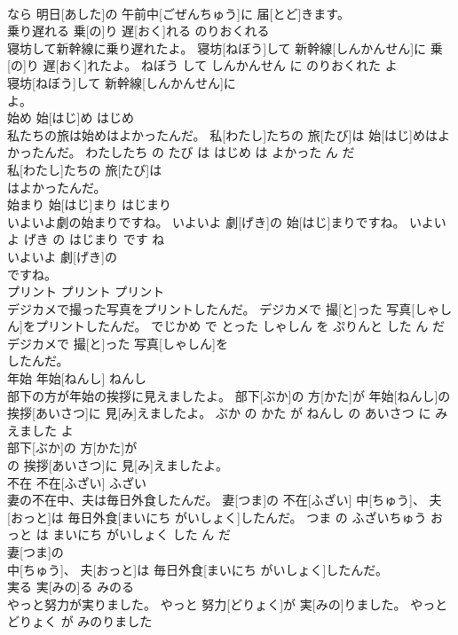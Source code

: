 \documentclass[8pt]{extreport}
\begin{document}
\begin{CJK}{UTF8}{min}
\\	なら 明日[あした]の 午前中[ごぜんちゅう]に 届[とど]きます。			
\\	乗り遅れる	乗[の]り 遅[おく]れる	のりおくれる	
\\	寝坊して新幹線に乗り遅れたよ。	寝坊[ねぼう]して 新幹線[しんかんせん]に 乗[の]り 遅[おく]れたよ。	ねぼう して しんかんせん に のりおくれた よ	
\\	寝坊[ねぼう]して 新幹線[しんかんせん]に
\\	よ。			
\\	始め	始[はじ]め	はじめ	
\\	私たちの旅は始めはよかったんだ。	私[わたし]たちの 旅[たび]は 始[はじ]めはよかったんだ。	わたしたち の たび は はじめ は よかった ん だ	
\\	私[わたし]たちの 旅[たび]は
\\	はよかったんだ。			
\\	始まり	始[はじ]まり	はじまり	
\\	いよいよ劇の始まりですね。	いよいよ 劇[げき]の 始[はじ]まりですね。	いよいよ げき の はじまり です ね	
\\	いよいよ 劇[げき]の
\\	ですね。			
\\	プリント	プリント	プリント	
\\	デジカメで撮った写真をプリントしたんだ。	デジカメで 撮[と]った 写真[しゃしん]をプリントしたんだ。	でじかめ で とった しゃしん を ぷりんと した ん だ	
\\	デジカメで 撮[と]った 写真[しゃしん]を
\\	したんだ。			
\\	年始	年始[ねんし]	ねんし	
\\	部下の方が年始の挨拶に見えましたよ。	部下[ぶか]の 方[かた]が 年始[ねんし]の 挨拶[あいさつ]に 見[み]えましたよ。	ぶか の かた が ねんし の あいさつ に みえました よ	
\\	部下[ぶか]の 方[かた]が
\\	の 挨拶[あいさつ]に 見[み]えましたよ。			
\\	不在	不在[ふざい]	ふざい	
\\	妻の不在中、夫は毎日外食したんだ。	妻[つま]の 不在[ふざい] 中[ちゅう]、 夫[おっと]は 毎日外食[まいにち がいしょく]したんだ。	つま の ふざいちゅう おっと は まいにち がいしょく した ん だ	
\\	妻[つま]の
\\	中[ちゅう]、 夫[おっと]は 毎日外食[まいにち がいしょく]したんだ。			
\\	実る	実[みの]る	みのる	
\\	やっと努力が実りました。	やっと 努力[どりょく]が 実[みの]りました。	やっと どりょく が みのりました	

\end{CJK}
\end{document}
